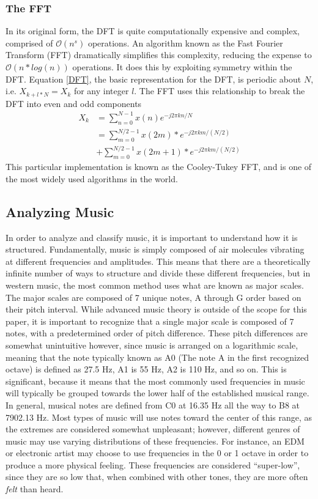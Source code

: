 \documentclass[conference]{IEEEtran}
\begin{document}
\subsubsection{The FFT}
In its original form, the DFT is quite computationally expensive and complex, comprised of $\mathcal{O}(n^{s})$ operations. An algorithm known as the Fast Fourier Transform (FFT) dramatically simplifies this complexity, reducing the expense to $\mathcal{O}(n*log(n))$ operations. It does this by exploiting symmetry within the DFT. Equation \eqref{DFT}, the basic representation for the DFT, is periodic about $N$, i.e. $X_{k+l*N}=X_{k}$ for any integer $l$. The FFT uses this relationship to break the DFT into even and odd components
\begin{equation}\label{FFT}
  \begin{split}
 X_{k} & =\sum_{n=0}^{N-1}{x(n)e^{-j2\pi kn/N}}\\
  & =\sum_{m=0}^{N/2-1}{x(2m)*e^{-j2\pi km/(N/2)}}\\ & + \sum_{m=0}^{N/2-1}{x(2m+1)*e^{-j2\pi km/(N/2)}}
  \end{split}
\end{equation}
This particular implementation is known as the Cooley-Tukey FFT, and is one of the most widely used algorithms in the world. 
\subsection{Analyzing Music}
In order to analyze and classify music, it is important to understand how it is structured. Fundamentally, music is simply composed of air molecules vibrating at different frequencies and amplitudes. This means that there are a theoretically infinite number of ways to structure and divide these different frequencies, but in western music, the most common method uses what are known as major scales. The major scales are composed of 7 unique notes, A through G order based on their pitch interval. While advanced music theory is outside of the scope for this paper, it is important to recognize that a single major scale is composed of 7 notes, with a predetermined order of pitch difference. These pitch differences are somewhat unintuitive however, since music is arranged on a logarithmic scale, meaning that the note typically known as A0 (The note A in the first recognized octave) is defined as 27.5 Hz, A1 is 55 Hz, A2 is 110 Hz, and so on. This is significant, because it means that the most commonly used frequencies in music will typically be grouped towards the lower half of the established musical range. In general, musical notes are defined from C0 at 16.35 Hz all the way to B8 at 7902.13 Hz. Most types of music will use notes toward the center of this range, as the extremes are considered somewhat unpleasant; however, different genres of music may use varying distributions of these frequencies. For instance, an EDM or electronic artist may choose to use frequencies in the 0 or 1 octave in order to produce a more physical feeling. These frequencies are considered ``super-low'', since they are so low that, when combined with other tones, they are more often \textit{felt} than heard.
\end{document}
